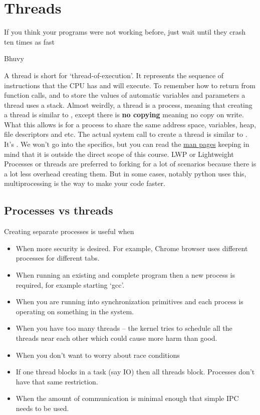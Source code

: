 \chapter{Threads}

\epigraph{If you think your programs were not working before, just wait until they crash ten times as fast}{Bhuvy}

A thread is short for `thread-of-execution'.
It represents the sequence of instructions that the CPU has and will execute.
To remember how to return from function calls, and to store the values of automatic variables and parameters a thread uses a stack.
Almost weirdly, a thread is a process, meaning that creating a thread is similar to , except there is \textbf{no copying} meaning no copy on write.
What this allows is for a process to share the same address space, variables, heap, file descriptors and etc.
The actual system call to create a thread is similar to . It's .
We won't go into the specifics, but you can read the \href{http://man7.org/linux/man-pages/man2/clone.2.html}{man pages} keeping in mind that it is outside the direct scope of this course.
LWP or Lightweight Processes or threads are preferred to forking for a lot of scenarios because there is a lot less overhead creating them.
But in some cases, notably python uses this, multiprocessing is the way to make your code faster.

\section{Processes vs threads}

Creating separate processes is useful when

\begin{itemize}
\item When more security is desired. For example, Chrome browser uses different processes for different tabs.
\item When running an existing and complete program then a new process is required, for example starting `gcc'.
\item When you are running into synchronization primitives and each process is operating on something in the system.
\item When you have too many threads -- the kernel tries to schedule all the threads near each other which could cause more harm than good.
\item When you don't want to worry about race conditions
\item If one thread blocks in a task (say IO) then all threads block. Processes don't have that same restriction.
\item When the amount of communication is minimal enough that simple IPC needs to be used.
\end{itemize}

